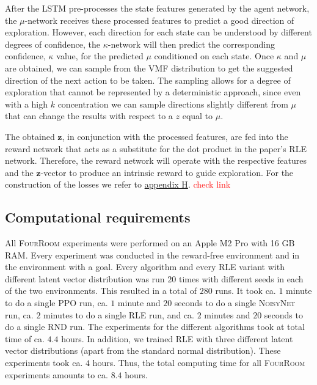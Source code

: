 \documentclass[10pt]{article} %
\begin{document}
After the LSTM pre-processes the state features generated by the agent network, the $\mu$-network receives these processed features to predict a good direction of exploration. However, each direction for each state can be understood by different degrees of confidence, the $\kappa$-network will then predict the corresponding confidence, $\kappa$ value, for the predicted $\mu$ conditioned on each state. Once $\kappa$ and $\mu$ are obtained, we can sample from the VMF distribution to get the suggested direction of the next action to be taken.  The sampling allows for a degree of exploration that cannot be represented by a deterministic approach, since even with a high $k$ concentration we can sample directions slightly different from $\mu$ that can change the results with respect to a $z$ equal to $\mu$.  

The obtained $\textbf{z}$, in conjunction with the processed features, are fed into the reward network that acts as a substitute for the dot product in the paper's \textsc{RLE} network. Therefore, the reward network will operate with the respective features and the $\textbf{z}$-vector to produce an intrinsic reward to guide exploration. For the construction of the losses we refer to \hyperlink{na-vmf}{appendix H}. \textcolor{red}{check link}

\hypertarget{computational-requirements}{\subsection{Computational requirements}}

All \textsc{FourRoom} experiments were performed on an Apple M2 Pro with 16 GB RAM. Every experiment was conducted in the reward-free environment and in the environment with a goal. Every algorithm and every \textsc{RLE} variant with different latent vector distribution was run $20$ times with different seeds in each of the two environments. This resulted in a total of $280$ runs. It took ca. $1$ minute to do a single \textsc{PPO} run, ca. $1$ minute and $20$ seconds to do a single \textsc{NoisyNet} run, ca. $2$ minutes to do a single \textsc{RLE} run, and ca. $2$ minutes and $20$ seconds to do a single \textsc{RND} run. The experiments for the different algorithms took at total time of ca. $4.4$ hours. In addition, we trained \textsc{RLE} with three different latent vector distributions (apart from the standard normal distribution). These experiments took ca. $4$ hours. Thus, the total computing time for all \textsc{FourRoom} experiments amounts to ca. $8.4$ hours.
\end{document}
